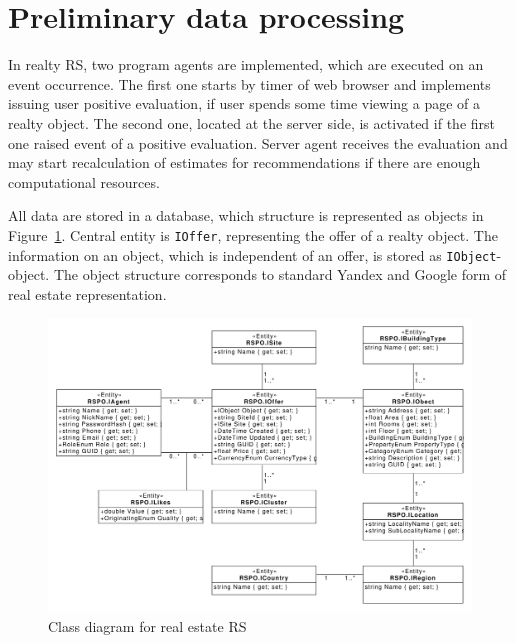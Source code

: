 \documentclass[conference]{IEEEtran}
\begin{document}

\section{Preliminary data processing}
\label{sec:relim-proc}




In realty RS, two program agents are implemented, which are executed on an event occurrence.  The first one starts by timer of web browser and implements issuing user positive evaluation, if user spends some time viewing a page of a realty object.  The second one, located at the server side, is activated if the first one raised event of a positive evaluation.  Server agent receives the evaluation and may start recalculation of estimates for recommendations if there are enough computational resources.

All data are stored in a database, which structure is represented as objects in Figure~\ref{fig:class-siag}.  Central entity is \texttt{IOffer}, representing the offer of a realty object.  The information on an object, which is independent of an offer, is stored as \texttt{IObject}-object.  The object structure corresponds to standard Yandex and Google form of real estate representation.

\begin{figure}[tb]
  \centering
   \includegraphics[width=0.7\linewidth]{class_diagram.pdf}
  \caption{Class diagram for real estate RS}
  \label{fig:class-siag}
\end{figure}
\end{document}
